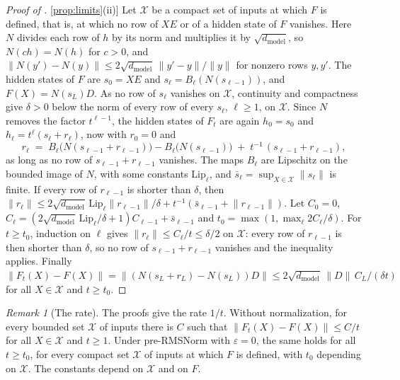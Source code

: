 \documentclass[10pt]{article}
\theoremstyle{definition}
\theoremstyle{remark}
\newtheorem{remark}[theorem]{Remark}
\newcommand{\dm}{d_{\mathrm{model}}}
\newcommand{\norm}[1]{\lVert #1\rVert}
\DeclareRobustCommand{\cpref}[2]{\hyperref[#1:#2]{\cref*{#1}(#2)}}
\begin{document}
\begin{proof}[Proof of \cpref{prop:limits}{ii}]
Let $\mathcal X$ be a compact set of inputs at which $F$ is defined, that is, at which no row of $XE$ or of a hidden state of $F$ vanishes. Here $N$ divides each row of $h$ by its norm and multiplies it by $\sqrt{\dm}$, so $N(ch) = N(h)$ for $c > 0$, and $\norm{N(y') - N(y)} \le 2\sqrt{\dm}\,\norm{y' - y}/\norm{y}$ for nonzero rows $y, y'$. The hidden states of $F$ are $s_0 = XE$ and $s_\ell = B_\ell(N(s_{\ell-1}))$, and $F(X) = N(s_L)D$. As no row of $s_\ell$ vanishes on $\mathcal X$, continuity and compactness give $\delta > 0$ below the norm of every row of every $s_\ell$, $\ell \ge 1$, on $\mathcal X$. Since $N$ removes the factor $t^{\ell-1}$, the hidden states of $F_t$ are again $h_0 = s_0$ and $h_\ell = t^\ell(s_\ell + r_\ell)$, now with $r_0 = 0$ and
\[
r_\ell \;=\; B_\ell\big(N(s_{\ell-1} + r_{\ell-1})\big) - B_\ell\big(N(s_{\ell-1})\big) \;+\; t^{-1}\,(s_{\ell-1} + r_{\ell-1}),
\]
as long as no row of $s_{\ell-1} + r_{\ell-1}$ vanishes. The maps $B_\ell$ are Lipschitz on the bounded image of $N$, with some constants $\mathrm{Lip}_\ell$, and $\bar s_\ell = \sup_{X \in \mathcal X}\norm{s_\ell}$ is finite. If every row of $r_{\ell-1}$ is shorter than $\delta$, then $\norm{r_\ell} \le 2\sqrt{\dm}\,\mathrm{Lip}_\ell\norm{r_{\ell-1}}/\delta + t^{-1}(\bar s_{\ell-1} + \norm{r_{\ell-1}})$. Let $C_0 = 0$, $C_\ell = (2\sqrt{\dm}\,\mathrm{Lip}_\ell/\delta + 1)C_{\ell-1} + \bar s_{\ell-1}$ and $t_0 = \max(1, \max_\ell 2C_\ell/\delta)$. For $t \ge t_0$, induction on $\ell$ gives $\norm{r_\ell} \le C_\ell/t \le \delta/2$ on $\mathcal X$: every row of $r_{\ell-1}$ is then shorter than $\delta$, so no row of $s_{\ell-1} + r_{\ell-1}$ vanishes and the inequality applies. Finally $\norm{F_t(X) - F(X)} = \norm{(N(s_L + r_L) - N(s_L))D} \le 2\sqrt{\dm}\,\norm{D}\,C_L/(\delta t)$ for all $X \in \mathcal X$ and $t \ge t_0$.
\end{proof}

\begin{remark}[The rate]\label{rem:limitrate}
The proofs give the rate $1/t$. Without normalization, for every bounded set $\mathcal X$ of inputs there is $C$ such that $\norm{F_t(X) - F(X)} \le C/t$ for all $X \in \mathcal X$ and $t \ge 1$. Under pre-RMSNorm with $\varepsilon = 0$, the same holds for all $t \ge t_0$, for every compact set $\mathcal X$ of inputs at which $F$ is defined, with $t_0$ depending on $\mathcal X$. The constants depend on $\mathcal X$ and on $F$.
\end{remark}
\end{document}
